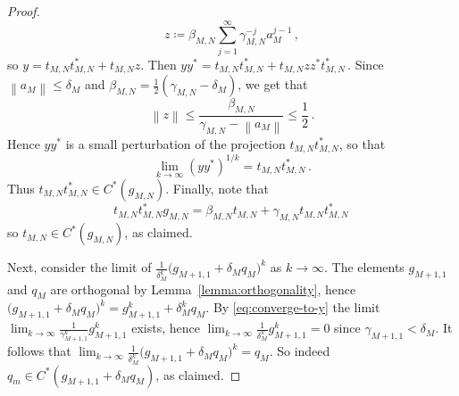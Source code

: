 \documentclass[10pt,a4paper]{amsart}
\newcommand{\Cstar}{\ensuremath{C^*}}
\newcommand{\norm}[1]{\left\|#1\right\|} %
\begin{document}
\begin{proof}
\begin{equation}
    z \coloneq \beta_{M,N} \sum_{j=1}^\infty \gamma_{M,N}^{-j} a_M^{j-1}\,,
    \end{equation}
    so $y = t_{M,N}t_{M,N}^* + t_{M,N} z$. Then
    $
    yy^* = t_{M,N}t_{M,N}^* + t_{M,N} z z^* t_{M,N}^*\,.
    $
    Since $\norm{a_M} \le \delta_M$ and $\beta_{M,N} = \frac{1}{2} (\gamma_{M,N} - \delta_M)$, we get that
    \begin{equation}
    \norm{z} \leq \frac{\beta_{M,N}}{\gamma_{M,N} - \norm{a_M}} \leq \frac{1}{2}\,.
    \end{equation}
    Hence $yy^*$ is a small perturbation of the projection $t_{M,N}t_{M,N}^*$, so that
    \begin{equation}
    \lim_{k\to\infty} (yy^*)^{1/k} = t_{M,N}t_{M,N}^*\,.
    \end{equation}
    Thus $t_{M,N}t_{M,N}^* \in C^*(g_{M,N})$. Finally, note that
    \begin{equation}
    t_{M,N}t_{M,N}^* g_{M,N} = \beta_{M,N} t_{M,N} + \gamma_{M,N} t_{M,N}t_{M,N}^*\,
    \end{equation}
    so $t_{M,N} \in C^*(g_{M,N})$, as claimed.

    Next, consider the limit of $\frac{1}{\delta_M^k}\big(g_{M+1,1} + \delta_M q_M\big)^k$ as $k \to \infty$. The elements $g_{M+1,1}$ and $q_M$ are orthogonal by Lemma~\ref{lemma:orthogonality}, hence $\big(g_{M+1,1} + \delta_M q_M\big)^k = g_{M+1,1}^k + \delta_M^k q_M$. By \eqref{eq:converge-to-y} the limit $\lim_{k \to \infty}\frac{1}{\gamma_{M+1,1}^k}g_{M+1,1}^k$ exists, hence $\lim_{k \to \infty}\frac{1}{\delta_{M}^k}g_{M+1,1}^k = 0$ since $\gamma_{M+1,1} < \delta_M$. It follows that $\lim_{k \to \infty} \frac{1}{\delta_M^k}\big(g_{M+1,1} + \delta_M q_M\big)^k = q_M$. So indeed $q_m \in \Cstar(g_{M+1,1} + \delta_M q_M)$, as claimed.
\end{proof}
\end{document}
